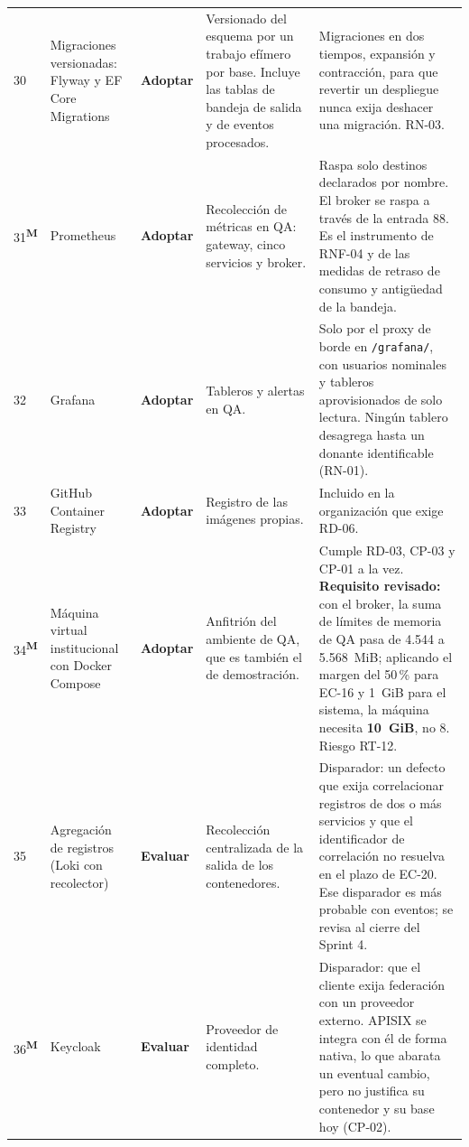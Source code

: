 \documentclass[11pt,a4paper]{article}
\newcommand{\adoptar}{\textcolor{ringAdoptar}{\textbf{Adoptar}}}
\newcommand{\evaluar}{\textcolor{ringEvaluar}{\textbf{Evaluar}}}
\newcommand{\modif}{\textsuperscript{\textcolor{ringProbar}{\scriptsize\bfseries M}}}
\begin{document}
\begin{longtable}{L{0.8cm} L{2.6cm} L{1.6cm} L{4.1cm} L{4.5cm}}
30 & Migraciones versionadas: Flyway y EF Core Migrations & \adoptar{} & Versionado del esquema por un trabajo efímero por base. Incluye las tablas de bandeja de salida y de eventos procesados. & Migraciones en dos tiempos, expansión y contracción, para que revertir un despliegue nunca exija deshacer una migración. RN-03. \\

31\modif & Prometheus & \adoptar{} & Recolección de métricas en QA: gateway, cinco servicios y broker. & Raspa solo destinos declarados por nombre. El broker se raspa a través de la entrada 88. Es el instrumento de RNF-04 y de las medidas de retraso de consumo y antigüedad de la bandeja. \\

32 & Grafana & \adoptar{} & Tableros y alertas en QA. & Solo por el proxy de borde en \texttt{/grafana/}, con usuarios nominales y tableros aprovisionados de solo lectura. Ningún tablero desagrega hasta un donante identificable (RN-01). \\

33 & GitHub Container Registry & \adoptar{} & Registro de las imágenes propias. & Incluido en la organización que exige RD-06. \\

34\modif & Máquina virtual institucional con Docker Compose & \adoptar{} & Anfitrión del ambiente de QA, que es también el de demostración. & Cumple RD-03, CP-03 y CP-01 a la vez. \textbf{Requisito revisado:} con el broker, la suma de límites de memoria de QA pasa de 4.544 a 5.568~MiB; aplicando el margen del 50\,\% para EC-16 y 1~GiB para el sistema, la máquina necesita \textbf{10~GiB}, no 8. Riesgo RT-12. \\

35 & Agregación de registros (Loki con recolector) & \evaluar{} & Recolección centralizada de la salida de los contenedores. & Disparador: un defecto que exija correlacionar registros de dos o más servicios y que el identificador de correlación no resuelva en el plazo de EC-20. Ese disparador es más probable con eventos; se revisa al cierre del Sprint 4. \\

36\modif & Keycloak & \evaluar{} & Proveedor de identidad completo. & Disparador: que el cliente exija federación con un proveedor externo. APISIX se integra con él de forma nativa, lo que abarata un eventual cambio, pero no justifica su contenedor y su base hoy (CP-02). \\


\end{longtable}
\end{document}
